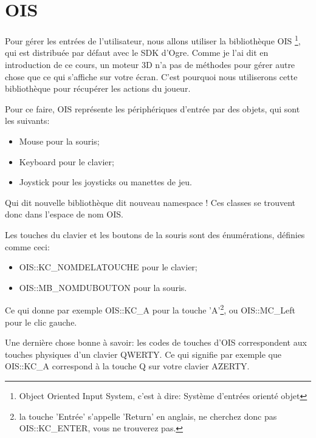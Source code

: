 \documentclass[10pt,a4paper]{report}
\begin{document}
\section{OIS}


Pour g\'erer les entr\'ees de l'utilisateur, nous allons utiliser la biblioth\`eque OIS \footnote{Object Oriented Input System, c'est \`a dire: Syst\`eme d'entr\'ees orient\'e objet}, qui est distribu\'ee par d\'efaut avec le SDK d'Ogre. Comme je l'ai dit en introduction de ce cours, un moteur 3D n'a pas de m\'ethodes pour g\'erer autre chose que ce qui s'affiche sur votre \'ecran. C'est pourquoi nous utiliserons cette biblioth\`eque pour r\'ecup\'erer les actions du joueur.\newline


Pour ce faire, OIS repr\'esente les p\'eriph\'eriques d'entr\'ee par des objets, qui sont les suivants:

\begin{itemize}
\item Mouse pour la souris;
\item Keyboard pour le clavier;
\item Joystick pour les joysticks ou manettes de jeu.\newline
\end{itemize}
    



Qui dit nouvelle biblioth\`eque dit nouveau namespace ! Ces classes se trouvent donc dans l'espace de nom OIS.\newline

Les touches du clavier et les boutons de la souris sont des \'enum\'erations, d\'efinies comme ceci:

\begin{itemize}
\item OIS::KC\_NOMDELATOUCHE pour le clavier;
\item OIS::MB\_NOMDUBOUTON pour la souris.
\end{itemize}


Ce qui donne par exemple OIS::KC\_A pour la touche 'A'\footnote{la touche 'Entr\'ee' s'appelle 'Return' en anglais, ne cherchez donc pas OIS::KC\_ENTER, vous ne trouverez pas.}, ou OIS::MC\_Left pour le clic gauche.\newline

Une derni\`ere chose bonne \`{a} savoir: les codes de touches d'OIS correspondent aux touches physiques d'un clavier QWERTY. Ce qui signifie par exemple que OIS::KC\_A correspond \`{a} la touche Q sur votre clavier AZERTY.\newline
\end{document}
